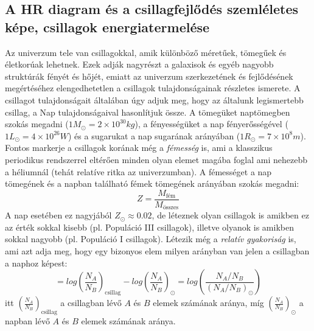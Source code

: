 \documentclass[../main.tex]{subfiles}
\begin{document}
\subsection{A HR diagram és a csillagfejlődés szemléletes képe, csillagok energiatermelése}
Az univerzum tele van csillagokkal, amik különböző méretűek, tömegűek és életkorúak lehetnek. Ezek adják nagyrészt a galaxisok és egyéb nagyobb struktúrák fényét és hőjét, emiatt az univerzum szerkezetének
és fejlődésének megértéséhez elengedhetetlen a csillagok tulajdonságainak részletes ismerete. A csillagot tulajdonságait általában úgy adjuk meg, hogy az általunk legismertebb csillag, a Nap tulajdonságaival hasonlítjuk össze.
A tömegüket naptömegben szokás megadni ($1 M_\odot = 2 \times 10^{30} kg$), a fényességüket a nap fényerősségével ($1 L_\odot = 4 \times 10^{26} W$) és a sugarukat a nap sugarának arányában ($1 R_\odot = 7 \times 10^8 m$).
Fontos markerje a csillagok korának még a \textit{fémesség} is, ami a klasszikus periodikus rendszerrel eltérően minden olyan elemet magába foglal ami nehezebb a héliumnál (tehát relatíve ritka az univerzumban). 
A fémességet a nap tömegének és a napban található fémek tömegének arányában szokás megadni:
\begin{equation}
    Z = \frac{M_\text{fém}}{M_\text{összes}}
\end{equation}
A nap esetében ez nagyjából $Z_\odot \approx 0.02$, de léteznek olyan csillagok is amikben ez az érték sokkal kisebb (pl. Populáció III csillagok), illetve olyanok is amikben sokkal nagyobb (pl. Populáció I csillagok).
Létezik még a \textit{relatív gyakoriság} is, ami azt adja meg, hogy egy bizonyos elem milyen arányban van jelen a csillagban a naphoz képest:
\begin{equation}
    [A/B] = log \left( \frac{N_A}{N_B} \right)_\text{csillag} - log \left( \frac{N_A}{N_B} \right)_\odot = log \left( \frac{N_A / N_B}{(N_A / N_B)_\odot} \right)
\end{equation}
itt $\left(\frac{N_A}{N_B}\right)_\text{csillag}$ a csillagban lévő $A$ és $B$ elemek számának aránya, míg $\left(\frac{N_A}{N_B}\right)_\odot$ a napban lévő $A$ és $B$ elemek számának aránya.
\end{document}
